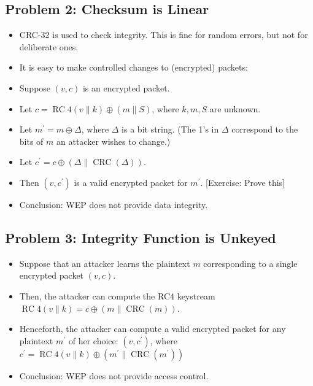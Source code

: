 \subsection*{Problem 2: Checksum is Linear}
\begin{itemize}
      \item CRC-32 is used to check integrity. This is fine for random errors, but not for deliberate ones.
      \item It is easy to make controlled changes to (encrypted) packets:
      \item Suppose $(v, c)$ is an encrypted packet.
      \item Let $c=\operatorname{RC} 4(v \| k) \oplus(m \| S)$,
            where $k, m, S$ are unknown.
      \item Let $m^{\prime}=m \oplus \Delta$, where $\Delta$ is a bit string. (The 1's in $\Delta$ correspond to the bits of $m$ an attacker wishes to change.)
      \item Let $c^{\prime}=c \oplus(\Delta \| \operatorname{CRC}(\Delta))$.
      \item Then $\left(v, c^{\prime}\right)$ is a valid encrypted packet for $m^{\prime}$. [Exercise: Prove this]
      \item Conclusion: WEP does not provide data integrity.
\end{itemize}

\subsection*{Problem 3: Integrity Function is Unkeyed}
\begin{itemize}
      \item Suppose that an attacker learns the plaintext $m$ corresponding to a single encrypted packet $(v, c)$.
      \item Then, the attacker can compute the RC4 keystream
            $\operatorname{RC} 4(v \| k)=c \oplus(m \| \operatorname{CRC}(m))$.
      \item Henceforth, the attacker can compute a valid encrypted packet for any plaintext $m^{\prime}$ of her choice:
            $\left(v, c^{\prime}\right)$,
            where $c^{\prime}=\operatorname{RC} 4(v \| k) \oplus\left(m^{\prime} \| \operatorname{CRC}\left(m^{\prime}\right)\right)$
      \item Conclusion: WEP does not provide access control.
\end{itemize}

